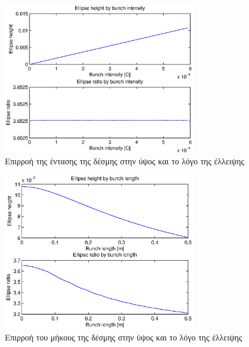 \begin{figure}[tbh]
\includegraphics[width=0.75\textwidth]{figures/beam_deflection_script_03_elipse_height}
\centering
\caption{Επιρροή της έντασης της δέσμης στην ύψος και το λόγο της έλλειψης}
\label{fig:beam_deflection_script_03_elipse_height}
\end{figure}

\begin{figure}[tbh]
\includegraphics[width=0.75\textwidth]{figures/beam_deflection_script_04_elipse_height_by_bunch_intensity}
\centering
\caption{Επιρροή του μήκους της δέσμης στην ύψος και το λόγο της έλλειψης}
\label{fig:beam_deflection_script_04_elipse_height_by_bunch_intensity}
\end{figure}

